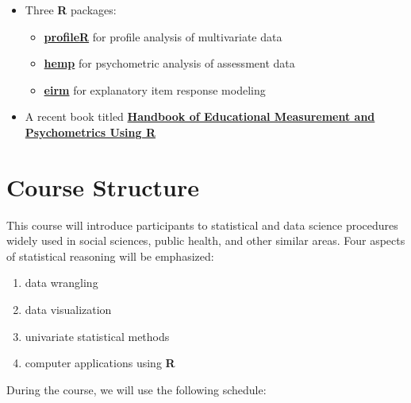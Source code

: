 \documentclass[]{book}
\providecommand{\tightlist}{%
  \setlength{\itemsep}{0pt}\setlength{\parskip}{0pt}}
\begin{document}
\begin{itemize}
\tightlist
\item
  Three \textbf{R} packages:

  \begin{itemize}
  \tightlist
  \item
    \href{https://cran.r-project.org/web/packages/profileR/index.html}{\textbf{profileR}} for profile analysis of multivariate data
  \item
    \href{https://github.com/cddesja/hemp}{\textbf{hemp}} for psychometric analysis of assessment data
  \item
    \href{https://github.com/okanbulut/eirm}{\textbf{eirm}} for explanatory item response modeling
  \end{itemize}
\item
  A recent book titled \href{https://www.crcpress.com/Handbook-of-Educational-Measurement-and-Psychometrics-Using-R/Desjardins-Bulut/p/book/9781498770132}{\textbf{Handbook of Educational Measurement and Psychometrics Using R}}
\end{itemize}

\hypertarget{course-structure}{%
\section{Course Structure}\label{course-structure}}

This course will introduce participants to statistical and data science procedures widely used in social sciences, public health, and other similar areas. Four aspects of statistical reasoning will be emphasized:

\begin{enumerate}
\def\labelenumi{\arabic{enumi}.}
\tightlist
\item
  data wrangling
\item
  data visualization
\item
  univariate statistical methods
\item
  computer applications using \textbf{R}
\end{enumerate}

During the course, we will use the following schedule:
\end{document}
